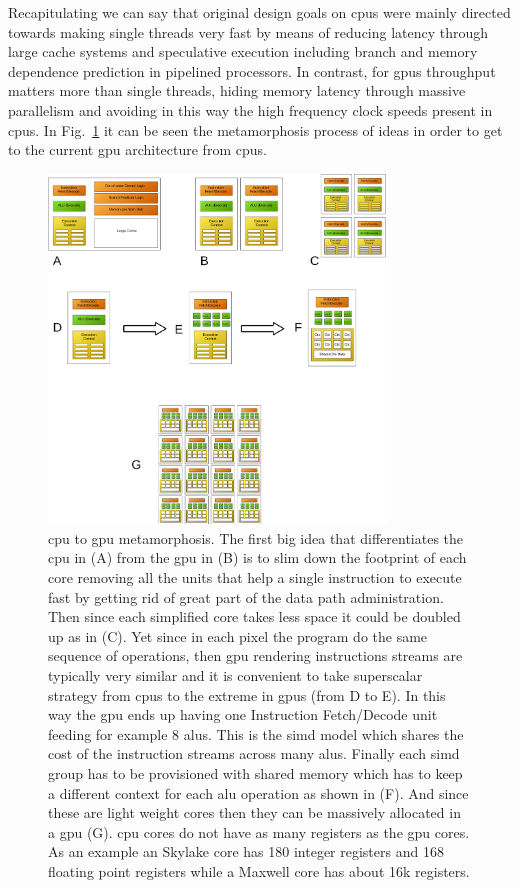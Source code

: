 \documentclass[11pt,a4paper]{article}
\begin{document}
Recapitulating we can say that original design goals on \glspl{cpu} were mainly directed towards making single threads very fast by means of reducing latency through large cache systems and speculative execution including branch and memory dependence prediction in pipelined processors. In contrast, for \glspl{gpu} throughput matters more than single threads, hiding memory latency through massive parallelism and avoiding in this way the high frequency clock speeds present in \glspl{cpu}. In Fig.~\ref{fig:CPU_to_GPU_metamorphosis} it can be seen the metamorphosis process of ideas in order to get to the current \gls{gpu} architecture from \glspl{cpu}.

\begin{figure}[h!]
    \centering
    \includegraphics[width=0.8\textwidth]{CPU_to_GPU_metamorphosis.png}
    \caption{\gls{cpu} to \gls{gpu} metamorphosis. The first big idea that differentiates the \gls{cpu} in (A) from the \gls{gpu} in (B) is to slim down the footprint of each core removing all the units that help a single instruction to execute fast by getting rid of great part of the data path administration. Then since each simplified core takes less space it could be doubled up as in (C). Yet since in each pixel the program do the same sequence of operations, then \gls{gpu} rendering instructions streams are typically very similar and it is convenient to take superscalar strategy from \glspl{cpu} to the extreme in \glspl{gpu} (from D to E). In this way the \gls{gpu} ends up having one Instruction Fetch/Decode unit feeding for example 8 \glspl{alu}. This is the \gls{simd} model which shares the cost of the instruction streams across many \glspl{alu}. Finally each \gls{simd} group has to be provisioned with shared memory which has to keep a different context for each \gls{alu} operation as shown in (F). And since these are light weight cores then they can be massively allocated in a \gls{gpu} (G). \gls{cpu} cores do not have as many registers as the \gls{gpu} cores. As an example an Skylake core has 180 integer registers and 168 floating point registers while a Maxwell core has about 16k registers.}
    \label{fig:CPU_to_GPU_metamorphosis}
\end{figure}
\end{document}
